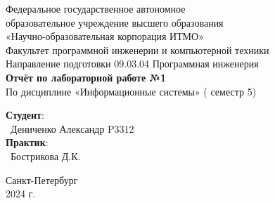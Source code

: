 \documentclass{article}
\begin{document}
\begin{center}
    \Large
    Федеральное государственное автономное \\
    образовательное учреждение высшего образования \\ 
    «Научно-образовательная корпорация ИТМО»\\
    \vspace{0.5cm}
    \large
    Факультет программной инженерии и компьютерной техники \\
    Направление подготовки 09.03.04 Программная инженерия \\
    \vspace{1cm}
    \Large
    \textbf{Отчёт по лабораторной работе №1} \\
    По дисциплине «Информационные системы» ( семестр 5)\\
    \large
    \vspace{8cm}

    \begin{minipage}{.33\textwidth}
    \end{minipage}
    \hfill
    \begin{minipage}{.4\textwidth}
    
        \textbf{Студент}: \vspace{.1cm} \\
        \ Дениченко Александр P3312\\
        \textbf{Практик}:  \\
        \ Бострикова Д.К.
    \end{minipage}
    \vfill
Санкт-Петербург\\ 2024 г.
\end{center}
\pagestyle{empty}
\newpage
\pagestyle{plain}
\end{document}
